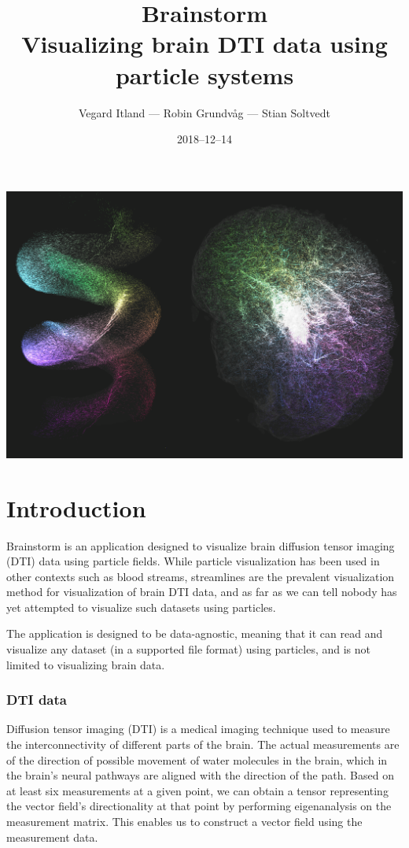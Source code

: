 \documentclass{article}
\title{%
Brainstorm\\
\large Visualizing brain DTI data using particle systems}
\author{Vegard Itland --- Robin Grundvåg --- Stian Soltvedt}
\date{2018--12--14}
\begin{document}
\maketitle
{}
\includegraphics[width=\textwidth]{brainstorm.png}
\section*{Introduction}

Brainstorm is an application designed to visualize brain diffusion tensor imaging (DTI) data using particle fields. While particle visualization has been used in other contexts such as blood streams, streamlines are the prevalent visualization method for visualization of brain DTI data, and as far as we can tell nobody has yet attempted to visualize such datasets using particles.

The application is designed to be data-agnostic, meaning that it can read and visualize any dataset (in a supported file format) using particles, and is not limited to visualizing brain data.

\subsubsection*{DTI data}

Diffusion tensor imaging (DTI) is a medical imaging technique used to measure the interconnectivity of different parts of the brain. The actual measurements are of the direction of possible movement of water molecules in the brain, which in the brain's neural pathways are aligned with the direction of the path. Based on at least six measurements at a given point, we can obtain a tensor representing the vector field's directionality at that point by performing eigenanalysis on the measurement matrix. This enables us to construct a vector field using the measurement data.
\end{document}
